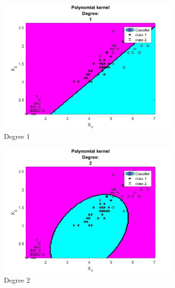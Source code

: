 \documentclass[11pt,oneside,a4paper]{article}
\begin{document}
\begin{figure}[H]
	\begin{subfigure}[b]{0.4\textwidth}
		\includegraphics[width=\textwidth]{../Figures/poly_degree_1}
		\caption{Degree 1}
	\end{subfigure}
	\begin{subfigure}[b]{0.4\textwidth}
		\includegraphics[width=\textwidth]{../Figures/poly_degree_2}
		\caption{Degree 2}
	\end{subfigure}
	\begin{subfigure}[b]{0.4\textwidth}

\end{subfigure}
\end{figure}
\end{document}
